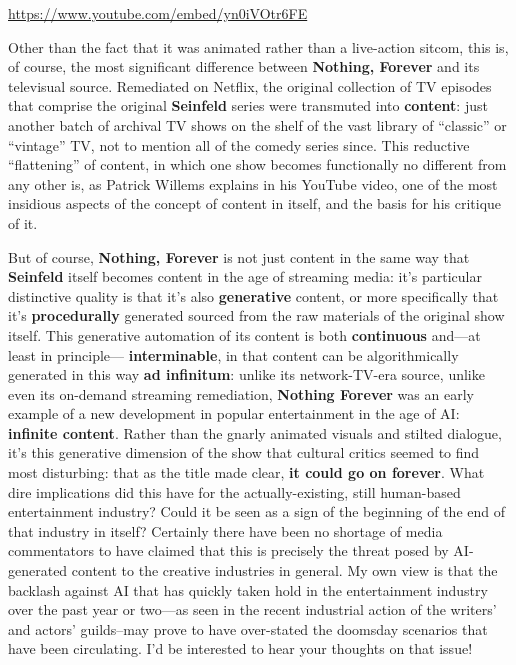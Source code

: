 \documentclass[
  letterpaper,
  DIV=11,
  numbers=noendperiod,
  oneside]{scrartcl}
\begin{document}
\url{https://www.youtube.com/embed/yn0iVOtr6FE}

Other than the fact that it was animated rather than a live-action
sitcom, this is, of course, the most significant difference between
\textbf{Nothing, Forever} and its televisual source. Remediated on
Netflix, the original collection of TV episodes that comprise the
original \textbf{Seinfeld} series were transmuted into \textbf{content}:
just another batch of archival TV shows on the shelf of the vast library
of ``classic'' or ``vintage'' TV, not to mention all of the comedy
series since. This reductive ``flattening'' of content, in which one
show becomes functionally no different from any other is, as Patrick
Willems explains in his YouTube video, one of the most insidious aspects
of the concept of content in itself, and the basis for his critique of
it.

But of course, \textbf{Nothing, Forever} is not just content in the same
way that \textbf{Seinfeld} itself becomes content in the age of
streaming media: it's particular distinctive quality is that it's also
\textbf{generative} content, or more specifically that it's
\textbf{procedurally} generated sourced from the raw materials of the
original show itself. This generative automation of its content is both
\textbf{continuous} and---at least in principle---
\textbf{interminable}, in that content can be algorithmically generated
in this way \textbf{ad infinitum}: unlike its network-TV-era source,
unlike even its on-demand streaming remediation, \textbf{Nothing
Forever} was an early example of a new development in popular
entertainment in the age of AI: \textbf{infinite content}. Rather than
the gnarly animated visuals and stilted dialogue, it's this generative
dimension of the show that cultural critics seemed to find most
disturbing: that as the title made clear, \textbf{it could go on
forever}. What dire implications did this have for the
actually-existing, still human-based entertainment industry? Could it be
seen as a sign of the beginning of the end of that industry in itself?
Certainly there have been no shortage of media commentators to have
claimed that this is precisely the threat posed by AI-generated content
to the creative industries in general. My own view is that the backlash
against AI that has quickly taken hold in the entertainment industry
over the past year or two---as seen in the recent industrial action of
the writers' and actors' guilds--may prove to have over-stated the
doomsday scenarios that have been circulating. I'd be interested to hear
your thoughts on that issue!
\end{document}
